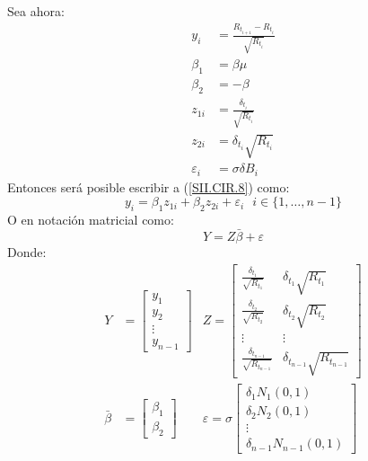 \documentclass[11pt,notitlepage]{article}
\begin{document}
        Sea ahora: 
        \begin{align*}
            y_{i} &= \frac{R_{t_{i + 1}} - R_{t_i}}{\sqrt{R_{t_i}}}\\
            \beta_1 &= \beta\mu\\
            \beta_2 &= -\beta\\
            z_{1i} &= \frac{\delta_{t_i}}{\sqrt{R_{t_i}}}\\
            z_{2i} &=  \delta_{t_i}\sqrt{R_{t_i}}\\
            \varepsilon_{i} &= \sigma\delta B_i
        \end{align*}
        Entonces será posible escribir a (\ref{SII.CIR.8}) como: 
        \[y_i = \beta_1z_{1i} + \beta_2z_{2i} + \varepsilon_{i} \ \ \ i\in\{1,\hdots,n-1\}\]
        O en notación matricial como: 
        \begin{equation}\label{SII.CIR.9}
            Y = Z\bar{\beta} + \varepsilon
        \end{equation}
        Donde:
        \begin{align*}
        Y &= \begin{bmatrix}
            y_1\\ 
            y_2\\ 
            \vdots\\
            y_{n-1} 
            \end{bmatrix} &Z = \begin{bmatrix}
            \frac{\delta_{t_1}}{\sqrt{R_{t_1}}} & \delta_{t_1}\sqrt{R_{t_1}}\\ 
            \frac{\delta_{t_2}}{\sqrt{R_{t_2}}} & \delta_{t_2}\sqrt{R_{t_2}}\\ 
            \vdots & \vdots\\ 
            \frac{\delta_{t_{n-1}}}{\sqrt{R_{t_{n-1}}}} & \delta_{t_{n-1}}\sqrt{R_{t_{n-1}}}
            \end{bmatrix}\\
        \bar{\beta} &= \begin{bmatrix}
            \beta_1\\ 
            \beta_2
       \end{bmatrix} &\varepsilon = \sigma\begin{bmatrix}
            \delta_1N_{1}(0,1)\\ 
            \delta_2N_{2}(0,1)\\ 
            \vdots\\ 
            \delta_{n-1}N_{n-1}(0,1)
            \end{bmatrix}
        \end{align*}
\end{document}
